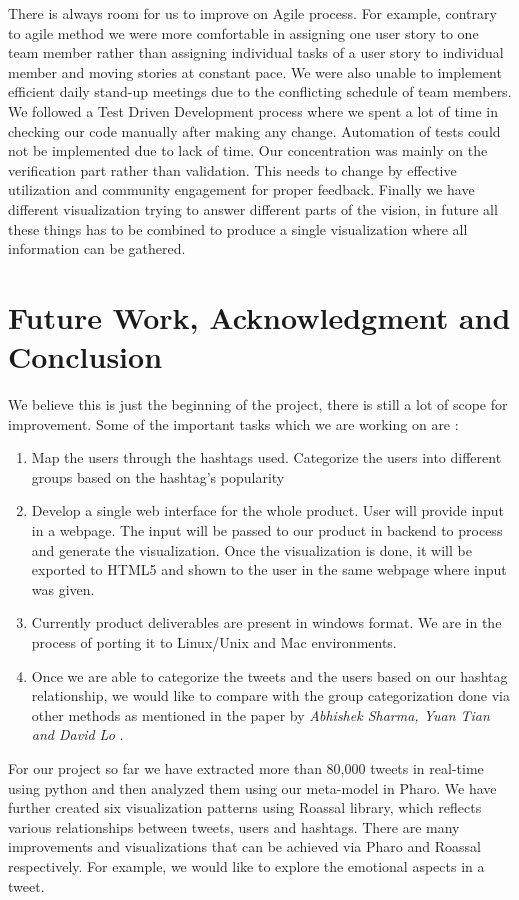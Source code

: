 \documentclass[11pt]{article}
\begin{document}
There is always room for us to improve on Agile process. For example, contrary to agile method we were more comfortable in assigning one user story to one team member rather than assigning individual tasks of a user story to individual member and moving stories at constant pace. We were also unable to implement efficient daily stand-up meetings due to the conflicting schedule of team members. We followed a Test Driven Development process where we spent a lot of time in checking our code manually after making any change. Automation of tests could not be implemented due to lack of time. Our concentration was mainly on the verification part rather than validation. This needs to change by effective utilization and community engagement for proper feedback. Finally we have different visualization trying to answer different parts of the vision, in future all these things has to be combined to produce a single visualization where all information can be gathered. 

\section{Future Work, Acknowledgment and Conclusion}

We believe this is just the beginning of the project, there is still a lot of scope for improvement. Some of the important tasks which we are working on are :
\begin{enumerate}
\item Map the users through the hashtags used. Categorize the users into different groups based on the hashtag's popularity
\item Develop a single web interface for the whole product. User will provide input in a webpage. The input will be passed to our product in backend to process and generate the visualization. Once the visualization is done, it will be exported to HTML5 and shown to the user in the same webpage where input was given.
\item Currently product deliverables are present in windows format. We are in the process of porting it to Linux/Unix and Mac environments.
\item Once we are able to categorize the tweets and the users based on our hashtag relationship, we would like to compare with the group categorization done via other methods as mentioned in the paper by \textit{Abhishek Sharma, Yuan Tian and David Lo}\cite{sehotintwitter} .
\end{enumerate}

For our project so far we have extracted more than 80,000 tweets in real-time using python and then analyzed them using our meta-model in Pharo. We have further created six visualization patterns using Roassal library, which reflects various relationships between tweets, users and hashtags. There are many improvements and visualizations that can be achieved via Pharo and Roassal respectively. For example, we would like to explore the emotional aspects in a tweet.
\end{document}
